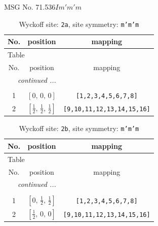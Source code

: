 \documentclass[fleqn,8pt]{jsarticle}
\begin{document}
\setcounter{MaxMatrixCols}{32}

\renewcommand{\tablename}{Table~}
\renewcommand{\figurename}{Figure~}
\begin{center}
\LARGE
MSG No. 71.536\quad$Im'm'm$
\end{center}
\renewcommand{\arraystretch}{1.2}
\begin{longtable}{ccc}
\caption{Wyckoff site: {\tt 2a}, site symmetry: {\tt m'm'm}}
 \\
 \hline \hline
No. & position & mapping \\ \hline \endfirsthead

\multicolumn{2}{l}{\tablename\ \thetable{}} \\
 \hline \hline
No. & position & mapping \\ \hline \endhead

 \hline \hline
\multicolumn{2}{r}{\footnotesize\it continued ...} \\ \endfoot

 \hline \hline
\multicolumn{2}{r}{} \\ \endlastfoot

1 & $\left[ 0,\, 0,\, 0 \right]$ & {\tt [1,2,3,4,5,6,7,8]} \\ \hline
2 & $\left[ \frac{1}{2},\, \frac{1}{2},\, \frac{1}{2} \right]$ & {\tt [9,10,11,12,13,14,15,16]} \\
\end{longtable}
\renewcommand{\arraystretch}{1.2}
\begin{longtable}{ccc}
\caption{Wyckoff site: {\tt 2b}, site symmetry: {\tt m'm'm}}
 \\
 \hline \hline
No. & position & mapping \\ \hline \endfirsthead

\multicolumn{2}{l}{\tablename\ \thetable{}} \\
 \hline \hline
No. & position & mapping \\ \hline \endhead

 \hline \hline
\multicolumn{2}{r}{\footnotesize\it continued ...} \\ \endfoot

 \hline \hline
\multicolumn{2}{r}{} \\ \endlastfoot

1 & $\left[ 0,\, \frac{1}{2},\, \frac{1}{2} \right]$ & {\tt [1,2,3,4,5,6,7,8]} \\ \hline
2 & $\left[ \frac{1}{2},\, 0,\, 0 \right]$ & {\tt [9,10,11,12,13,14,15,16]} \\
\end{longtable}
\end{document}

